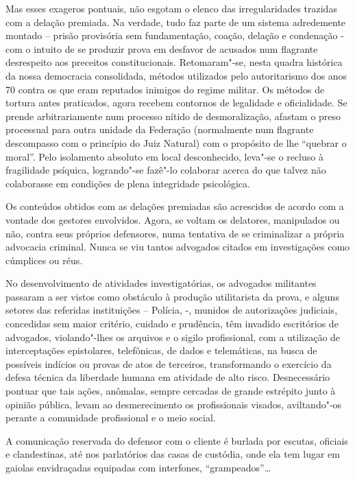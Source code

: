 Mas esses exageros pontuais, não esgotam o elenco das irregularidades
trazidas com a delação premiada. Na verdade, tudo faz parte de um
sistema adredemente montado -- prisão provisória sem fundamentação,
coação, delação e condenação - com o intuito de se produzir prova em
desfavor de acusados num flagrante desrespeito aos preceitos
constitucionais. Retomaram"-se, nesta quadra histórica da nossa
democracia consolidada, métodos utilizados pelo autoritarismo dos anos
70 contra os que eram reputados inimigos do regime militar. Os métodos
de tortura antes praticados, agora recebem contornos de legalidade e
oficialidade. Se prende arbitrariamente num processo nítido de
desmoralização, afastam o preso processual para outra unidade da
Federação (normalmente num flagrante descompasso com o princípio do Juiz
Natural) com o propósito de lhe ``quebrar o moral''. Pelo isolamento
absoluto em local desconhecido, leva"-se o recluso à fragilidade
psíquica, logrando"-se fazê"-lo colaborar acerca do que talvez não
colaborasse em condições de plena integridade psicológica.

Os conteúdos obtidos com as delações premiadas são acrescidos de acordo
com a vontade dos gestores envolvidos. Agora, se voltam os delatores,
manipulados ou não, contra seus próprios defensores, numa tentativa de
se criminalizar a própria advocacia criminal. Nunca se viu tantos
advogados citados em investigações como cúmplices ou réus.

No desenvolvimento de atividades investigatórias, os advogados
militantes passaram a ser vistos como obstáculo à produção utilitarista
da prova, e alguns setores das referidas instituições -- Polícia,  -,
munidos de autorizações judiciais, concedidas sem maior critério,
cuidado e prudência, têm invadido escritórios de advogados,
violando"-lhes os arquivos e o sigilo profissional, com a utilização de
interceptações epistolares, telefônicas, de dados e telemáticas, na
busca de possíveis indícios ou provas de atos de terceiros,
transformando o exercício da defesa técnica da liberdade humana em
atividade de alto risco. Desnecessário pontuar que tais ações, anômalas,
sempre cercadas de grande estrépito junto à opinião pública, levam ao
desmerecimento os profissionais visados, aviltando"-os perante a
comunidade profissional e o meio social.

A comunicação reservada do defensor com o cliente é burlada por escutas,
oficiais e clandestinas, até nos parlatórios das casas de custódia, onde
ela tem lugar em gaiolas envidraçadas equipadas com interfones,
``grampeados''\ldots{}

